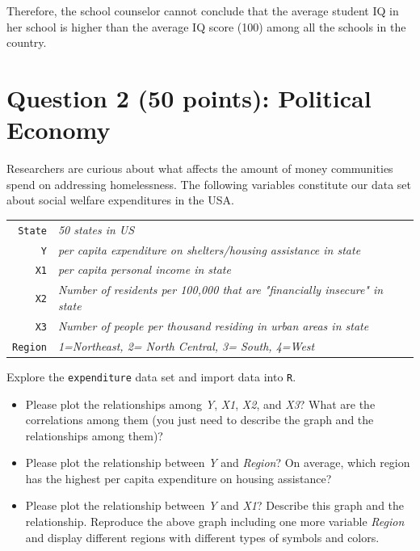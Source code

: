 \documentclass[12pt,letterpaper]{article}
\begin{document}
\noindent
Therefore, the school counselor cannot conclude that the average student IQ in her school is higher than the average IQ score (100) among all the schools in the country.
\\\vspace{.5cm}

\newpage

	\section*{Question 2 (50 points): Political Economy}

\noindent Researchers are curious about what affects the amount of money communities spend on addressing homelessness. The following variables constitute our data set about social welfare expenditures in the USA. \\
\vspace{.5cm}


\begin{tabular}{r|l}
	\texttt{State} &\emph{50 states in US} \\
	\texttt{Y} & \emph{per capita expenditure on shelters/housing assistance in state}\\
	\texttt{X1} &\emph{per capita personal income in state} \\
	\texttt{X2} &  \emph{Number of residents per 100,000 that are "financially insecure" in state}\\
	\texttt{X3} &  \emph{Number of people per thousand residing in urban areas in state} \\
	\texttt{Region} &  \emph{1=Northeast, 2= North Central, 3= South, 4=West} \\
\end{tabular}

\vspace{.5cm}
\noindent Explore the \texttt{expenditure} data set and import data into \texttt{R}.
\vspace{.5cm}
\vspace{.5cm}
\begin{itemize}

\item
Please plot the relationships among \emph{Y}, \emph{X1}, \emph{X2}, and \emph{X3}? What are the correlations among them (you just need to describe the graph and the relationships among them)?
\vspace{.5cm}
\item
Please plot the relationship between \emph{Y} and \emph{Region}? On average, which region has the highest per capita expenditure on housing assistance?
\vspace{.5cm}
\item
Please plot the relationship between \emph{Y} and \emph{X1}? Describe this graph and the relationship. Reproduce the above graph including one more variable \emph{Region} and display different regions with different types of symbols and colors.
\end{itemize}
\end{document}
